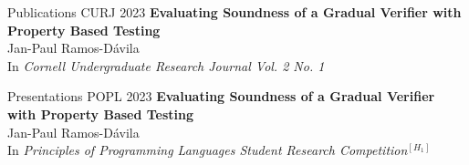 
\begin{rSection}{Publications}
	\large{CURJ 2023} \phantom{} \hspace{3.5mm} \textbf{Evaluating Soundness of a Gradual Verifier with Property Based Testing} \href{https://journals.library.cornell.edu/index.php/CURJ/}{\ExternalLink}
	\\ 
	\phantom{} \hspace{2.6cm} \small{Jan-Paul Ramos-D{\'a}vila}\normalsize{}
	\\
	\phantom{} \hspace{2.6cm} \color{darkgray}\small{In \textit{Cornell Undergraduate Research Journal Vol. 2 No. 1}} \color{black}

\end{rSection}

\begin{rSection}{Presentations}
	\large{POPL 2023} \phantom{} \hspace{3.5mm} \textbf{Evaluating Soundness of a Gradual Verifier with Property Based Testing} \href{https://popl23.sigplan.org/details/POPL-2023-student-research-competition/13/Evaluating-Soundness-of-a-Gradual-Verifier-with-Property-Based-Testing}{\ExternalLink} \href{https://www.youtube.com/@acmsigplan/playlists?view=50&sort=dd&shelf_id=1}{\ExternalLink}
	\\ 
	\phantom{} \hspace{2.6cm} \small{Jan-Paul Ramos-D{\'a}vila}\normalsize{} 
	\\
	\phantom{} \hspace{2.6cm} \color{darkgray}\small{In \textit{Principles of Programming Languages Student Research Competition}}$^{[H_1]}$ \color{black}
\end{rSection}
